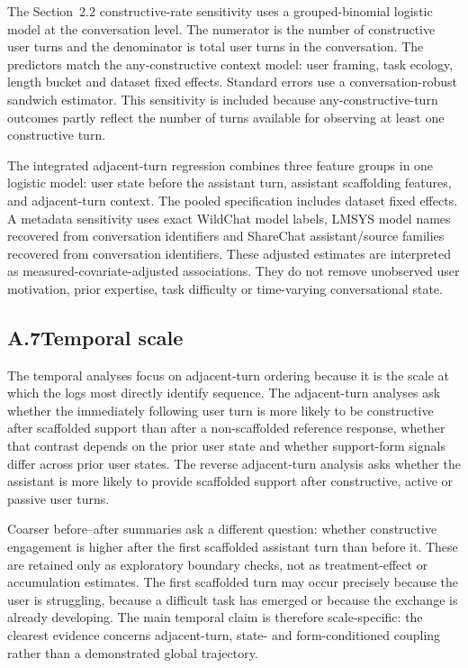 The Section~2.2 constructive-rate sensitivity uses a grouped-binomial logistic model at the conversation level. The numerator is the number of constructive user turns and the denominator is total user turns in the conversation. The predictors match the any-constructive context model: user framing, task ecology, length bucket and dataset fixed effects. Standard errors use a conversation-robust sandwich estimator. This sensitivity is included because any-constructive-turn outcomes partly reflect the number of turns available for observing at least one constructive turn.

The integrated adjacent-turn regression combines three feature groups in one logistic model: user state before the assistant turn, assistant scaffolding features, and adjacent-turn context. The pooled specification includes dataset fixed effects. A metadata sensitivity uses exact WildChat model labels, LMSYS model names recovered from conversation identifiers and ShareChat assistant/source families recovered from conversation identifiers. These adjusted estimates are interpreted as measured-covariate-adjusted associations. They do not remove unobserved user motivation, prior expertise, task difficulty or time-varying conversational state.

\subsection*{A.7\quad Temporal scale}

The temporal analyses focus on adjacent-turn ordering because it is the scale at which the logs most directly identify sequence. The adjacent-turn analyses ask whether the immediately following user turn is more likely to be constructive after scaffolded support than after a non-scaffolded reference response, whether that contrast depends on the prior user state and whether support-form signals differ across prior user states. The reverse adjacent-turn analysis asks whether the assistant is more likely to provide scaffolded support after constructive, active or passive user turns.

Coarser before--after summaries ask a different question: whether constructive engagement is higher after the first scaffolded assistant turn than before it. These are retained only as exploratory boundary checks, not as treatment-effect or accumulation estimates. The first scaffolded turn may occur precisely because the user is struggling, because a difficult task has emerged or because the exchange is already developing. The main temporal claim is therefore scale-specific: the clearest evidence concerns adjacent-turn, state- and form-conditioned coupling rather than a demonstrated global trajectory.

